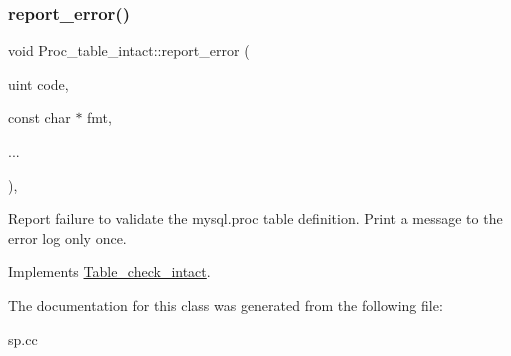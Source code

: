\subsubsection{\texorpdfstring{report\+\_\+error()}{report\_error()}}
{\footnotesize\ttfamily void Proc\+\_\+table\+\_\+intact\+::report\+\_\+error (\begin{DoxyParamCaption}\item[{uint}]{code,  }\item[{const char $\ast$}]{fmt,  }\item[{}]{... }\end{DoxyParamCaption})\hspace{0.3cm}{\ttfamily [protected]}, {\ttfamily [virtual]}}

Report failure to validate the mysql.\+proc table definition. Print a message to the error log only once. 

Implements \mbox{\hyperlink{classTable__check__intact}{Table\+\_\+check\+\_\+intact}}.



The documentation for this class was generated from the following file\+:\begin{DoxyCompactItemize}
\item 
sp.\+cc\end{DoxyCompactItemize}

